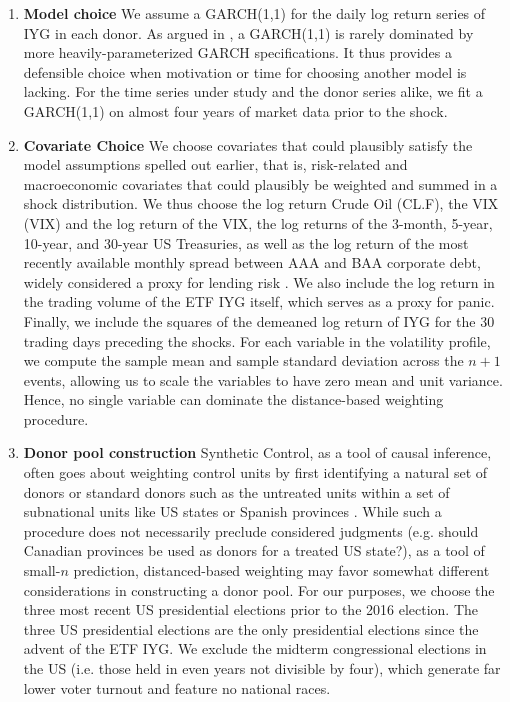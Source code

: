 \documentclass[11pt,3p,review,authoryear]{elsarticle}
\theoremstyle{definition}
\begin{document}
\begin{enumerate}
    \item \textbf{Model choice} We assume a GARCH(1,1) for the daily log return series of IYG in each donor.  As argued in \citet{hansen2005forecast}, a GARCH(1,1) is rarely dominated by more heavily-parameterized GARCH specifications.  It thus provides a defensible choice when motivation or time for choosing another model is lacking.  For the time series under study and the donor series alike, we fit a GARCH(1,1) on almost four years of market data prior to the shock.

    \item \textbf{Covariate Choice} We choose covariates that could plausibly satisfy the model assumptions spelled out earlier, that is, risk-related and macroeconomic covariates that could plausibly be weighted and summed in a shock distribution.  We thus choose the log return Crude Oil (CL.F), the VIX (VIX) and the log return of the VIX, the log returns of the 3-month, 5-year, 10-year, and 30-year US Treasuries, as well as the log return of the most recently available monthly spread between AAA and BAA corporate debt, widely considered a proxy for lending risk \citep{goodell2013us, kane1996p}.  We also include the log return in the trading volume of the ETF IYG itself, which serves as a proxy for panic.  Finally, we include the squares of the demeaned log return of IYG for the 30 trading days preceding the shocks.  For each variable in the volatility profile, we compute the sample mean and sample standard deviation across the $n+1$ events, allowing us to scale the variables to have zero mean and unit variance.  Hence, no single variable can dominate the distance-based weighting procedure.

    \item \textbf{Donor pool construction} Synthetic Control, as a tool of causal inference, often goes about weighting control units by first identifying a natural set of donors or standard donors such as the untreated units within a set of subnational units like US states or Spanish provinces \citep{abadie2003economic, abadie2010synthetic}.  While such a procedure does not necessarily preclude considered judgments (e.g. should Canadian provinces be used as donors for a treated US state?), as a tool of small-$n$ prediction, distanced-based weighting may favor somewhat different considerations in constructing a donor pool.  For our purposes, we choose the three most recent US presidential elections prior to the 2016 election.  The three US presidential elections are the only presidential elections since the advent of the ETF IYG.  We exclude the midterm congressional elections in the US (i.e. those held in even years not divisible by four), which generate far lower voter turnout and feature no national races.


\end{enumerate}
\end{document}
